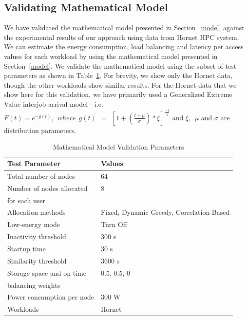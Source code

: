 \subsection{Validating Mathematical Model}
\label{validate_model}
We have validated the mathematical model presented in Section~\ref{model} against the
experimental results of our approach using data from Hornet HPC system. We can estimate the energy
consumption, load balancing and latency per access values for each workload
by using the mathematical model presented in Section~\ref{model}. We validate
the mathematical model using the subset of test parameters as shown in
Table~\ref{tbl:validate_params}.
For brevity, we show only the Hornet data, though the other workloads show similar results.
For the Hornet data that we show here for this validation, we have primarily used a Generalized
Extreme Value interjob arrival model - i.e.
$F(t) = e^{-g(t)},\ \ where\ \ g(t)\ \ =\ \ [{1 + (\frac{t - \mu}{\sigma}) * \xi}]^{\frac{-1}{\xi}}$
and $\xi,\ \ \mu$ and $\sigma$ are distribution parameters.

\begin{table}[!htbp]
 \begin{center}
  \begin{tabular}{|l|l|} \hline
Test Parameter & Values \\ \hline
Total number of nodes          & 64 \\ \hline
Number of nodes allocated        & 8 \\
for each user              & \\ \hline
Allocation methods           & Fixed, Dynamic Greedy, Correlation-Based \\ \hline
Low-energy mode             & Turn Off \\ \hline
Inactivity threshold          & 300 s \\ \hline
Startup time              & 30 s \\ \hline
Similarity threshold          & 3600 s \\ \hline
Storage space and on-time        & 0.5, 0.5, 0 \\
balancing weights            & \\ \hline
Power consumption per node       & 300 W \\ \hline
Workloads                        & Hornet \\ \hline
  \end{tabular}
 \end{center}
 \caption{Mathematical Model Validation Parameters}
 \label{tbl:validate_params}
\end{table}


